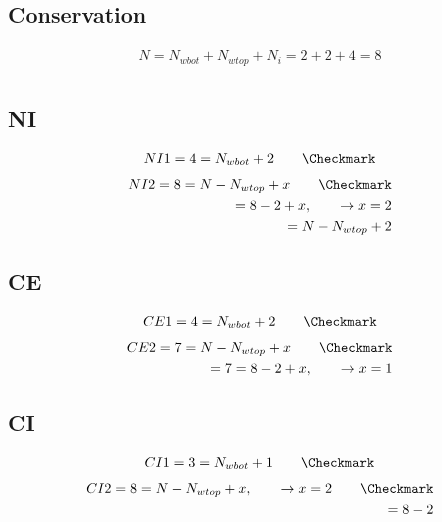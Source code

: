 \documentclass[11pt]{article}
\begin{document}
\subsection{Conservation}
\begin{equation}\begin{aligned}
    N = N_{wbot} + N_{wtop} + N_i = 2 + 2 + 4 = 8 \\
\end{aligned}\end{equation}
\subsection{NI}
\begin{equation}\begin{aligned}
    NI1 = 4 = N_{wbot} + 2  \qquad \text{\Checkmark} \\
\end{aligned}\end{equation}
\begin{equation}\begin{aligned}
    NI2 = 8 = N - N_{wtop} + x  \qquad \text{\Checkmark} \\
    = 8 - 2 + x, \qquad \rightarrow x = 2 \\
    = N - N_{wtop} + 2
\end{aligned}\end{equation}

\subsection{CE}
\begin{equation}\begin{aligned}
    CE1 = 4 = N_{wbot} + 2  \qquad \text{\Checkmark} \\
\end{aligned}\end{equation}
\begin{equation}\begin{aligned}
    CE2 = 7 = N - N_{wtop} + x  \qquad \text{\Checkmark} \\
    = 7 = 8 - 2 + x, \qquad \rightarrow x = 1
\end{aligned}\end{equation}

\subsection{CI}
\begin{equation}\begin{aligned}
    CI1 = 3 = N_{wbot} + 1  \qquad \text{\Checkmark} \\
\end{aligned}\end{equation}
\begin{equation}\begin{aligned}
    CI2 = 8 = N - N_{wtop} + x, \qquad \rightarrow x = 2  \qquad \text{\Checkmark} \\
    = 8 - 2
\end{aligned}\end{equation}
\end{document}
